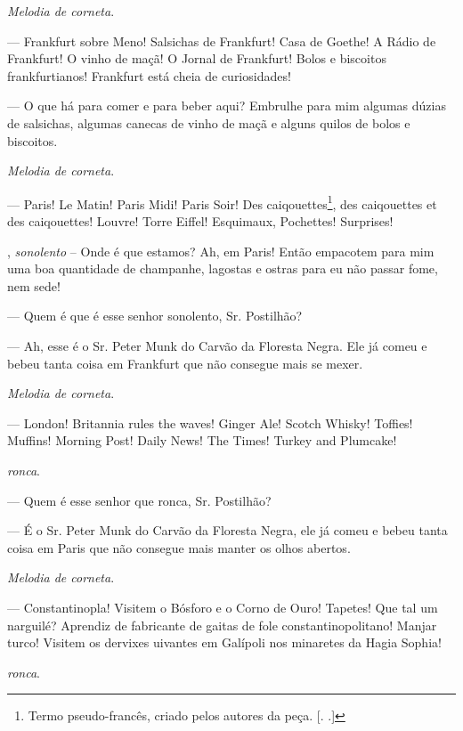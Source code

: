 \begin{myparindent}{0pt}
\begin{Parskip}
\emph{Melodia de corneta}.

 --- Frankfurt sobre Meno! Salsichas de Frankfurt! Casa
de Goethe! A Rádio de Frankfurt! O vinho de maçã! O Jornal de Frankfurt!
Bolos e biscoitos frankfurtianos! Frankfurt está cheia de curiosidades!

 --- O que há para comer e para beber aqui? Embrulhe
para mim algumas dúzias de salsichas, algumas canecas de vinho de maçã e
alguns quilos de bolos e biscoitos.

\emph{Melodia de corneta}.

 --- Paris! Le Matin! Paris Midi! Paris Soir! Des
caiqouettes\footnote{Termo pseudo-francês, criado pelos autores da peça.
  [. .]}, des caiqouettes et des caiqouettes! Louvre! Torre
Eiffel! Esquimaux, Pochettes! Surprises!

, \emph{sonolento} -- Onde é que estamos? Ah, em
Paris! Então empacotem para mim uma boa quantidade de champanhe,
lagostas e ostras para eu não passar fome, nem sede!

 --- Quem é que é esse senhor sonolento, Sr. Postilhão?

 --- Ah, esse é o Sr. Peter Munk do Carvão da Floresta Negra.
Ele já comeu e bebeu tanta coisa em Frankfurt que não consegue mais se
mexer.

\emph{Melodia de corneta}.

 --- London! Britannia rules the waves! Ginger Ale!
Scotch Whisky! Toffies! Muffins! Morning Post! Daily News! The Times!
Turkey and Plumcake!

 \emph{ronca}.

 --- Quem é esse senhor que ronca, Sr. Postilhão?

 --- É o Sr. Peter Munk do Carvão da Floresta Negra, ele já
comeu e bebeu tanta coisa em Paris que não consegue mais manter os olhos
abertos.

\emph{Melodia de corneta}.

 --- Constantinopla! Visitem o Bósforo e o Corno de
Ouro! Tapetes! Que tal um narguilé? Aprendiz de fabricante de gaitas de
fole constantinopolitano! Manjar turco! Visitem os dervixes uivantes em
Galípoli nos minaretes da Hagia Sophia!

 \emph{ronca}.


\end{Parskip}
\end{myparindent}
